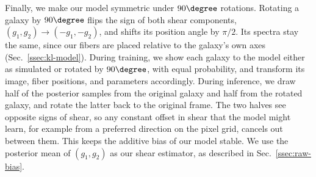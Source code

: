 Finally, we make our model symmetric under $90\degree$ rotations. Rotating a galaxy by $90\degree$ flips the sign of both shear components, $(g_1, g_2) \rightarrow (-g_1, -g_2)$, and shifts its position angle by $\pi/2$. Its spectra stay the same, since our fibers are placed relative to the galaxy's own axes (Sec.~\ref{ssec:kl-model}). During training, we show each galaxy to the model either as simulated or rotated by $90\degree$, with equal probability, and transform its image, fiber positions, and parameters accordingly. During inference, we draw half of the posterior samples from the original galaxy and half from the rotated galaxy, and rotate the latter back to the original frame. The two halves see opposite signs of shear, so any constant offset in shear that the model might learn, for example from a preferred direction on the pixel grid, cancels out between them. This keeps the additive bias of our model stable. We use the posterior mean of $(g_1, g_2)$ as our shear estimator, as described in Sec.~\ref{ssec:raw-bias}.

